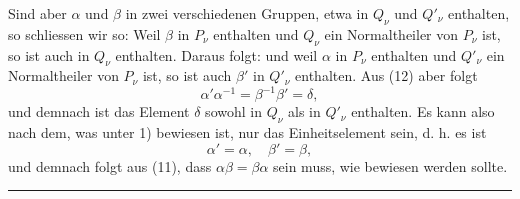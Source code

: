 Sind aber $\alpha$ und $\beta$ in zwei verschiedenen Gruppen, etwa in $Q_\nu$ und $Q'_\nu$ enthalten, so schliessen wir so: Weil $\beta$ in $P_\nu$ enthalten und $Q_\nu$ ein Normaltheiler von $P_\nu$ ist, so ist auch
in $Q_\nu$ enthalten. Daraus folgt:
und weil $\alpha$ in $P_\nu$ enthalten und $Q'_\nu$ ein Normaltheiler von $P_\nu$ ist, so ist auch $\beta'$ in $Q'_\nu$ enthalten. Aus (12) aber folgt
\[ \alpha'\alpha^{-1} = \beta^{-1}\beta' = \delta, \]
und demnach ist das Element $\delta$ sowohl in $Q_\nu$ als in $Q'_\nu$ enthalten. Es kann also nach dem, was unter 1) bewiesen ist, nur das Einheitselement sein, d. h. es ist
\[ \alpha' = \alpha, \quad \beta' = \beta, \]
und demnach folgt aus (11), dass $\alpha\beta = \beta\alpha$ sein muss, wie bewiesen werden sollte.

\begin{center}
\rule{3cm}{0.4pt}
\end{center}
